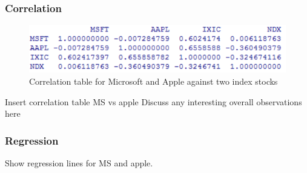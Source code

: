 \documentclass[paper=a4, fontsize=11pt]{scrartcl} %
\numberwithin{equation}{section} %
\numberwithin{figure}{section} %
\numberwithin{table}{section} %
\begin{document}
\subsubsection{Correlation}

\begin{figure}[!htb]
  \includegraphics[width=\linewidth]{graph/cor10.png}
  \caption{Correlation table for Microsoft and Apple against two index stocks}
\endminipage\hfill
\end{figure}

Insert correlation table MS vs apple
Discuss any interesting overall observations here

\subsubsection{Regression}
Show regression lines for MS and apple. 
\end{document}
